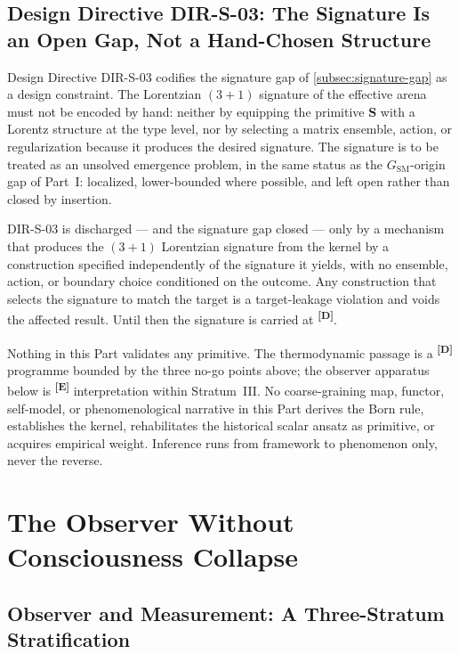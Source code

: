 \documentclass[12pt,a4paper,twoside]{article}
\theoremstyle{plain}
\theoremstyle{definition}
\theoremstyle{remark}
\newcommand{\catmark}[1]{\textsuperscript{\textsf{\textbf{[#1]}}}}
\begin{document}
\subsection{Design Directive DIR-S-03: The Signature Is an Open Gap, Not a Hand-Chosen Structure}
\label{subsec:dir-s-03}

Design Directive DIR-S-03 codifies the signature gap of
\cref{subsec:signature-gap} as a design constraint. The Lorentzian
$(3{+}1)$ signature of the effective arena must not be encoded by hand:
neither by equipping the primitive $\mathbf S$ with a Lorentz structure at
the type level, nor by selecting a matrix ensemble, action, or
regularization because it produces the desired signature. The signature is
to be treated as an unsolved emergence problem, in the same status as the
$G_{\mathrm{SM}}$-origin gap of Part~I: localized, lower-bounded where
possible, and left open rather than closed by insertion.

\begin{killswitch}
DIR-S-03 is discharged --- and the signature gap closed --- only by a
mechanism that produces the $(3{+}1)$ Lorentzian signature from the kernel
by a construction specified independently of the signature it yields, with
no ensemble, action, or boundary choice conditioned on the outcome. Any
construction that selects the signature to match the target is a
target-leakage violation and voids the affected result. Until then the
signature is carried at \catmark{D}.
\end{killswitch}

\begin{governancebox}
Nothing in this Part validates any primitive. The thermodynamic passage
is a \catmark{D} programme bounded by the three no-go points above; the
observer apparatus below is \catmark{E} interpretation within
Stratum~III. No coarse-graining map, functor, self-model, or
phenomenological narrative in this Part derives the Born rule,
establishes the kernel, rehabilitates the historical scalar ansatz as primitive, or acquires
empirical weight. Inference runs from framework to phenomenon only,
never the reverse.
\end{governancebox}

\section{The Observer Without Consciousness Collapse}
\label{sec:observer-no-collapse}

\subsection{Observer and Measurement: A Three-Stratum Stratification}
\label{subsec:observer-stratification}
\end{document}
